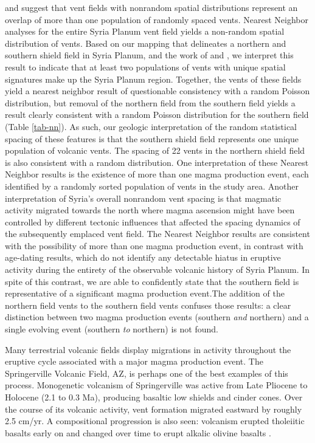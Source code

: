 \documentclass[preprint,review,authoryear,12pt]{elsarticle}
\begin{document}
\citet{Lutz1986} and \citet{Lutz1995} suggest that vent fields with nonrandom spatial distributions represent an overlap of more than one population of randomly spaced vents. Nearest Neighbor analyses for the entire Syria Planum vent field yields a non-random spatial distribution of vents. Based on our mapping that delineates a northern and southern shield field in Syria Planum, and the work of \citet{Lutz1986} and \citet{Lutz1995}, we interpret this result to indicate that at least two populations of vents with unique spatial signatures make up the Syria Planum region. Together, the vents of these fields yield a nearest neighbor result of questionable consistency with a random Poisson distribution, but removal of the northern field from the southern field yields a result clearly consistent with a random Poisson distribution for the southern field (Table \ref{tab-nn}). As such, our geologic interpretation of the random statistical spacing of these features is that the southern shield field represents one unique population of volcanic vents. The spacing of 22 vents in the northern shield field is also consistent with a random distribution. One interpretation of these Nearest Neighbor results is the existence of more than one magma production event, each identified by a randomly sorted population of vents in the study area. Another interpretation of Syria's overall nonrandom vent spacing is that magmatic activity migrated towards the north where magma ascension might have been controlled by different tectonic influences that affected the spacing dynamics of the subsequently emplaced vent field. The Nearest Neighbor results are consistent with the possibility of more than one magma production event, in contrast with age-dating results, which do not identify any detectable hiatus in eruptive activity during the entirety of the observable volcanic history of Syria Planum. In spite of this contrast, we are able to confidently state that the southern field is representative of a significant magma production event.The addition of the northern field vents to the southern field vents confuses those results: a clear distinction between two magma production events (southern \textit{and} northern) and a single evolving event (southern \textit{to} northern) is not found.

Many terrestrial volcanic fields display migrations in activity throughout the eruptive cycle associated with a major magma production event.  The Springerville Volcanic Field, AZ, is perhaps one of the best examples of this process. Monogenetic volcanism of Springerville was active from Late Pliocene to Holocene (2.1 to 0.3 Ma), producing basaltic low shields and cinder cones. Over the course of its volcanic activity, vent formation migrated eastward by roughly 2.5 cm/yr. A compositional progression is also seen: volcanism erupted tholeiitic basalts early on and changed over time to erupt alkalic olivine basalts \citep{Condit1989,Condit1999}.
\end{document}

